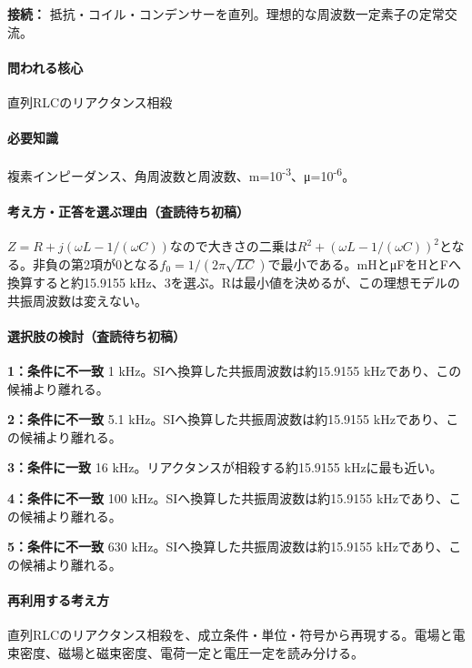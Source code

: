 \noindent\textbf{接続：} 抵抗・コイル・コンデンサーを直列。理想的な周波数一定素子の定常交流。\par

\paragraph{問われる核心} 直列RLCのリアクタンス相殺

\paragraph{必要知識} 複素インピーダンス、角周波数と周波数、m=\allowbreak{}10\textsuperscript{-3}、μ=10\textsuperscript{-6}。

\paragraph{考え方・正答を選ぶ理由（査読待ち初稿）} \(Z=R+j(\omega L-1/(\omega C))\)なので大きさの二乗は\(R^2+(\omega L-1/(\omega C))^2\)となる。非負の第2項が0となる\(f_0=1/(2\pi\sqrt{LC})\)で最小である。mHとμFをHとFへ換算すると約15.9155 kHz、3を選ぶ。Rは最小値を決めるが、この理想モデルの共振周波数は変えない。

\paragraph{選択肢の検討（査読待ち初稿）}\mbox{}\par

\noindent\textbf{1：条件に不一致} 1 kHz。SIへ換算した共振周波数は約15.9155 kHzであり、この候補より離れる。\par

\noindent\textbf{2：条件に不一致} 5.1 kHz。SIへ換算した共振周波数は約15.9155 kHzであり、この候補より離れる。\par

\noindent\textbf{3：条件に一致} 16 kHz。リアクタンスが相殺する約15.9155 kHzに最も近い。\par

\noindent\textbf{4：条件に不一致} 100 kHz。SIへ換算した共振周波数は約15.9155 kHzであり、この候補より離れる。\par

\noindent\textbf{5：条件に不一致} 630 kHz。SIへ換算した共振周波数は約15.9155 kHzであり、この候補より離れる。\par

\paragraph{再利用する考え方} 直列RLCのリアクタンス相殺を、成立条件・単位・符号から再現する。電場と電束密度、磁場と磁束密度、電荷一定と電圧一定を読み分ける。

